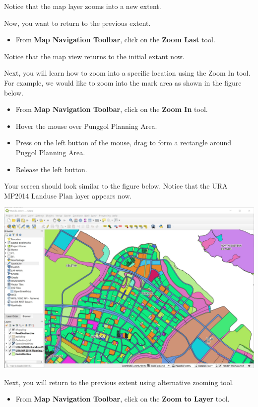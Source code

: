 \documentclass[
  letterpaper,
  DIV=11,
  numbers=noendperiod]{scrreprt}
\providecommand{\tightlist}{%
  \setlength{\itemsep}{0pt}\setlength{\parskip}{0pt}}\usepackage{longtable,booktabs,array}
\begin{document}
Notice that the map layer zooms into a new extent.

Now, you want to return to the previous extent.

\begin{itemize}
\tightlist
\item
  From \textbf{Map Navigation Toolbar}, click on the \textbf{Zoom Last}
  tool.
\end{itemize}

Notice that the map view returns to the initial extant now.

Next, you will learn how to zoom into a specific location using the Zoom
In tool. For example, we would like to zoom into the mark area as shown
in the figure below.

\begin{itemize}
\tightlist
\item
  From \textbf{Map Navigation Toolbar}, click on the \textbf{Zoom In}
  tool.
\item
  Hover the mouse over Punggol Planning Area.
\item
  Press on the left button of the mouse, drag to form a rectangle around
  Puggol Planning Area.
\item
  Release the left button.
\end{itemize}

Your screen should look similar to the figure below. Notice that the URA
MP2014 Landuse Plan layer appears now.

\includegraphics{./img/image1-15.jpg}

Next, you will return to the previous extent using alternative zooming
tool.

\begin{itemize}
\tightlist
\item
  From \textbf{Map Navigation Toolbar}, click on the \textbf{Zoom to
  Layer} tool.
\end{itemize}
\end{document}
